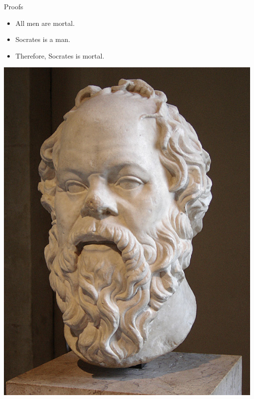 \documentclass[department=ds, notes={hide notes}, slidesperpage=1]{beamerruhuisstijl}
\begin{document}
\begin{frame}{Proofs}
	\begin{minipage}{0.5\textwidth}
		\begin{itemize}
			\item All men are mortal.
			\item Socrates is a man.
			\item Therefore, Socrates is mortal.
		\end{itemize}
	\end{minipage}
	\hspace{2em}
	\begin{minipage}{0.4\textwidth}
		\includegraphics[width=1.0\textwidth]{figures/socrates.jpg}\\
		\centering \color{gray}{Eric Gaba (CC by-nc-sa 2.5)}
	\end{minipage}
\end{frame}
\end{document}
